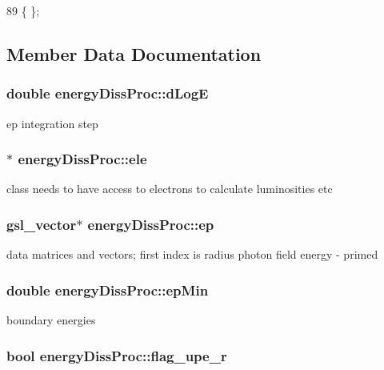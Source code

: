 \begin{DoxyCode}
89 \{ \};
\end{DoxyCode}


\subsection{Member Data Documentation}
\hypertarget{classenergyDissProc_a270fdc20de5c26f9cc499f28dd32fb7b}{
\subsubsection[{d\-Log\-E}]{\setlength{\rightskip}{0pt plus 5cm}double energy\-Diss\-Proc\-::d\-Log\-E}}\label{classenergyDissProc_a270fdc20de5c26f9cc499f28dd32fb7b}
ep integration step \hypertarget{classenergyDissProc_a0dbf0777938131e938c1fdad5df38a7f}{
\subsubsection[{ele}]{$\ast$ energy\-Diss\-Proc\-::ele}}\label{classenergyDissProc_a0dbf0777938131e938c1fdad5df38a7f}
class needs to have access to electrons to calculate luminosities etc \hypertarget{classenergyDissProc_a36330825cd7737639d5d223281b1c7e1}{
\subsubsection[{ep}]{\setlength{\rightskip}{0pt plus 5cm}gsl\-\_\-vector$\ast$ energy\-Diss\-Proc\-::ep}}\label{classenergyDissProc_a36330825cd7737639d5d223281b1c7e1}
data matrices and vectors; first index is radius photon field energy -\/ primed \hypertarget{classenergyDissProc_a57aee74ef8fc4cb9220127a9c345174a}{
\subsubsection[{ep\-Min}]{\setlength{\rightskip}{0pt plus 5cm}double energy\-Diss\-Proc\-::ep\-Min}}\label{classenergyDissProc_a57aee74ef8fc4cb9220127a9c345174a}
boundary energies \hypertarget{classenergyDissProc_a7b51925f603e271657cab66afe822591}{
\subsubsection[{flag\-\_\-upe\-\_\-r}]{\setlength{\rightskip}{0pt plus 5cm}bool energy\-Diss\-Proc\-::flag\-\_\-upe\-\_\-r}}\label{classenergyDissProc_a7b51925f603e271657cab66afe822591}
